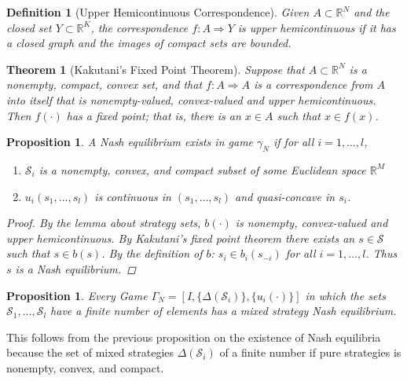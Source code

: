 \documentclass[12pt]{extreport} %
\theoremstyle{named}
\theoremstyle{itshape}
\newtheorem{theorem}[unnamedtheorem]{Theorem}
\newtheorem*{definition}{Definition}
\theoremstyle{normal}
\newtheorem{proposition}[unnamedtheorem]{Proposition}
\begin{document}
\begin{definition}[Upper Hemicontinuous Correspondence]
	Given $A \subset \mathbb{R}^{N}$ and the closed set $Y \subset \mathbb{R}^{K}$, the correspondence $f \colon A \Rightarrow Y$ is upper hemicontinuous if it has a closed graph and the images of compact sets are bounded.
\end{definition} 

\begin{theorem}[Kakutani's Fixed Point Theorem]
	Suppose that $A \subset \mathbb{R}^N$ is a nonempty, compact, convex set, and that $f \colon A \Rightarrow A$ is a correspondence from $A$ into itself that is nonempty-valued, convex-valued and upper hemicontinuous. ~\\
	
	Then $f(\cdot)$ has a fixed point; that is, there is an $x \in A$ such that $x \in f(x)$.
\end{theorem}
 
\begin{proposition}
	A Nash equilibrium exists in game $\gamma_N$ if for all $i = 1, \dotsc, l$,
	\begin{enumerate}
		\item $\mathcal{S}_i$ is a nonempty, convex, and compact subset of some Euclidean space $\mathbb{R}^M$
		\item $u_i(s_1, \dotsc, s_l)$ is continuous in $(s_1, \dotsc, s_l)$ and quasi-concave in $s_i$.
	\end{enumerate}
	
	\begin{proof}
		By the lemma about strategy sets, $b(\cdot)$ is nonempty, convex-valued and upper hemicontinuous. By Kakutani's fixed point theorem there exists an $s \in \mathcal{S}$ such that $s \in b(s)$. By the definition of $b$: $s_i \in b_i(s_{-i})$ for all $i = 1, \dotsc, l$. Thus $s$ is a Nash equilibrium.
	\end{proof}
\end{proposition} 

\begin{proposition}
	Every Game $\Gamma_N = \left[ I, \{ \Delta(\mathcal{S}_i) \}, \{u_i(\cdot)\} \right]$ in which the sets $\mathcal{S}_1, \dotsc, \mathcal{S}_l$ have a finite number of elements has a mixed strategy Nash equilibrium.
\end{proposition}

This follows from the previous proposition on the existence of Nash equilibria because the set of mixed strategies $\Delta(\mathcal{S}_i)$ of a finite number if pure strategies is nonempty, convex, and compact.
 
\end{document}
